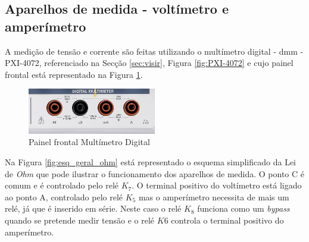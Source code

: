 


\subsection{Aparelhos de medida - voltímetro e amperímetro}
\label{sec:aparelhosmedida}

A medição de tensão e corrente são feitas utilizando o multímetro digital - \Acrfull{dmm} - PXI-4072, referenciado na Secção \ref{sec:visir}, Figura \ref{fig:PXI-4072} e cujo painel frontal está representado na Figura \ref{fig:frontDMM}.

\begin{figure}[hbtp]
	\centering
	\includegraphics[width=0.5\textwidth]{figures/promenorDMM.png}
	\caption{Painel frontal Multímetro Digital}
	\label{fig:frontDMM}
\end{figure}

Na Figura \ref{fig:esq_geral_ohm} está representado o esquema simplificado da Lei de \textit{Ohm} que pode ilustrar o funcionamento dos aparelhos de medida. O ponto C é comum e é controlado pelo relé $K_{7}$. O terminal positivo do voltímetro está ligado ao ponto A, controlado pelo relé $K_{5}$ mas o amperímetro necessita de mais um relé, já que é inserido em série. Neste caso o relé $K_{8}$ funciona como um \textit{bypass} quando se pretende medir tensão e o relé $K{6}$ controla o terminal positivo do amperímetro. 

